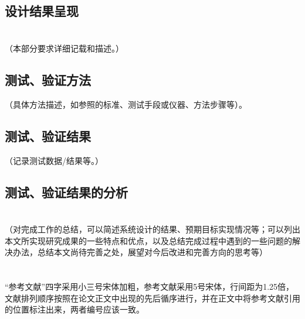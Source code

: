 	\newpage

	\subsection{设计结果呈现} %
	\label{sub:设计结果呈现}
	

\cleardoublepage
\section{} %
\label{sec:系统测试、验证与结果分析}
	（本部分要求详细记载和描述。）
	\subsection{测试、验证方法} %
	\label{sub:测试、验证方法}
		（具体方法描述，如参照的标准、测试手段或仪器、方法步骤等）。
	\newpage

	\subsection{测试、验证结果} %
	\label{sub:测试、验证结果}
		（记录测试数据/结果等。）
	\newpage

	\subsection{测试、验证结果的分析} %
	\label{sub:测试_验证结果的分析}
	

\cleardoublepage
\section{} %
\label{sec:结论}
	（对完成工作的总结，可以简述系统设计的结果、预期目标实现情况等；可以列出本文所实现研究成果的一些特点和优点，以及总结完成过程中遇到的一些问题的解决办法，总结本文尚待完善之处，展望对今后改进和完善方向的思考等）

\cleardoublepage
\section*{} %
\label{sec:参考文献}
	“参考文献”四字采用小三号宋体加粗，参考文献采用5号宋体，行间距为1.25倍，文献排列顺序按照在论文正文中出现的先后循序进行，并在正文中将参考文献引用的位置标注出来，两者编号应该一致。

